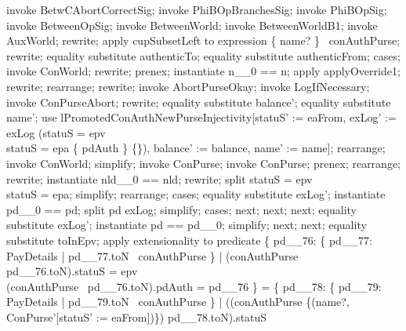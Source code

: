 \begin{LPScript}\begin{zproof}[lAuxWorldCAbortType]
\end{zproof}%
    invoke BetwCAbortCorrectSig;
    invoke PhiBOpBranchesSig;
    invoke PhiBOpSig;
    invoke BetweenOpSig;
    invoke BetweenWorld;
    invoke BetweenWorldB1;
    invoke AuxWorld;
    rewrite;
    apply cupSubsetLeft to expression \{ name? \} \cup \dom~conAuthPurse;
    rewrite;
    equality substitute authenticTo;
    equality substitute authenticFrom;
    cases;
    invoke ConWorld;
    rewrite;
    prenex;
    instantiate n\_\_0 == n;
    apply applyOverride1;
    rewrite;
    rearrange;
    rewrite;
    invoke AbortPurseOkay;
    invoke LogIfNecessary;
    invoke \Xi ConPurseAbort;
    rewrite;
    equality substitute balance';
    equality substitute name';
    use
    lPromotedConAuthNewPurseInjectivity[statuS' := eaFrom,
                                        exLog'
                                            := exLog
                                            \cup (\IF      statuS = epv \\
                                                        \lor statuS = epa
                                                    \THEN \{ pdAuth \}
                                                    \ELSE \{\}),
                                        balance' := balance, name' := name];
    rearrange;
    invoke ConWorld;
    simplify;
    invoke \Delta ConPurse;
    invoke ConPurse;
    prenex;
    rearrange;
    rewrite;
    instantiate nld\_\_0 == nld;
    rewrite;
    split
        statuS = epv \\
    \lor statuS = epa;
    simplify;
    rearrange;
    cases;
    equality substitute exLog';
    instantiate pd\_\_0 == pd;
    split pd \in exLog;
    simplify;
    cases;
    next;
    next;
    next;
    equality substitute exLog';
    instantiate pd == pd\_\_0;
    simplify;
    next;
    next;
    equality substitute toInEpv;
    apply extensionality to predicate
    \{ pd\_\_76: \{ pd\_\_77: PayDetails | pd\_\_77.toN \in \dom~conAuthPurse \}
        |       (conAuthPurse~ pd\_\_76.toN).statuS = epv \\
            \land (conAuthPurse~ pd\_\_76.toN).pdAuth = pd\_\_76 \}
    = \{ pd\_\_78: \{ pd\_\_79: PayDetails | pd\_\_79.toN \in \dom~conAuthPurse \}
            |       ((conAuthPurse
                    \oplus \{(name?, \theta ConPurse'[statuS' := eaFrom])\})
                    pd\_\_78.toN).statuS

\end{LPScript}
